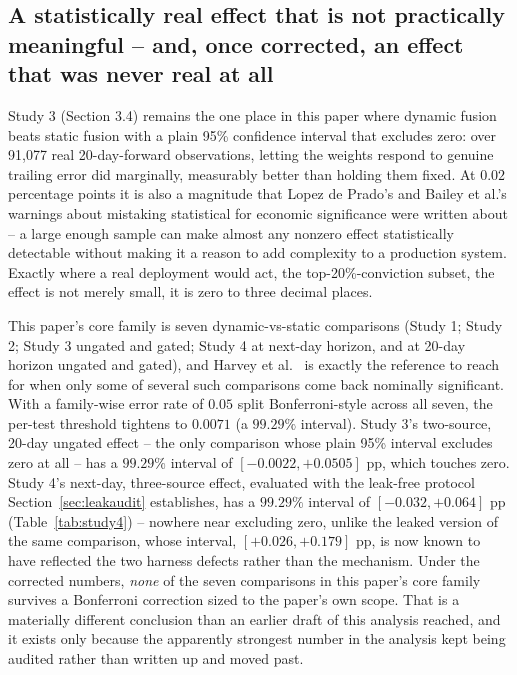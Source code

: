 \documentclass[10pt,a4paper,twocolumn]{article}
\begin{document}
\subsection{A statistically real effect that is not practically meaningful -- and, once corrected, an effect that was never real at all}

Study 3 (Section 3.4) remains the one place in this paper where dynamic fusion beats static fusion with a plain 95\% confidence interval that excludes zero: over 91,077 real 20-day-forward observations, letting the weights respond to genuine trailing error did marginally, measurably better than holding them fixed. At $0.02$ percentage points it is also a magnitude that Lopez de Prado's and Bailey et al.'s warnings about mistaking statistical for economic significance were written about \cite{lopezdeprado2018,bailey2014} -- a large enough sample can make almost any nonzero effect statistically detectable without making it a reason to add complexity to a production system. Exactly where a real deployment would act, the top-20\%-conviction subset, the effect is not merely small, it is zero to three decimal places.

This paper's core family is seven dynamic-vs-static comparisons (Study 1; Study 2; Study 3 ungated and gated; Study 4 at next-day horizon, and at 20-day horizon ungated and gated), and Harvey et al.\ \cite{harvey2016} is exactly the reference to reach for when only some of several such comparisons come back nominally significant. With a family-wise error rate of $0.05$ split Bonferroni-style across all seven, the per-test threshold tightens to $0.0071$ (a $99.29\%$ interval). Study 3's two-source, 20-day ungated effect -- the only comparison whose plain 95\% interval excludes zero at all -- has a $99.29\%$ interval of $[-0.0022,+0.0505]$ pp, which touches zero. Study 4's next-day, three-source effect, evaluated with the leak-free protocol Section~\ref{sec:leakaudit} establishes, has a $99.29\%$ interval of $[-0.032,+0.064]$ pp (Table~\ref{tab:study4}) -- nowhere near excluding zero, unlike the leaked version of the same comparison, whose interval, $[+0.026,+0.179]$ pp, is now known to have reflected the two harness defects rather than the mechanism. Under the corrected numbers, \emph{none} of the seven comparisons in this paper's core family survives a Bonferroni correction sized to the paper's own scope. That is a materially different conclusion than an earlier draft of this analysis reached, and it exists only because the apparently strongest number in the analysis kept being audited rather than written up and moved past.
\end{document}
